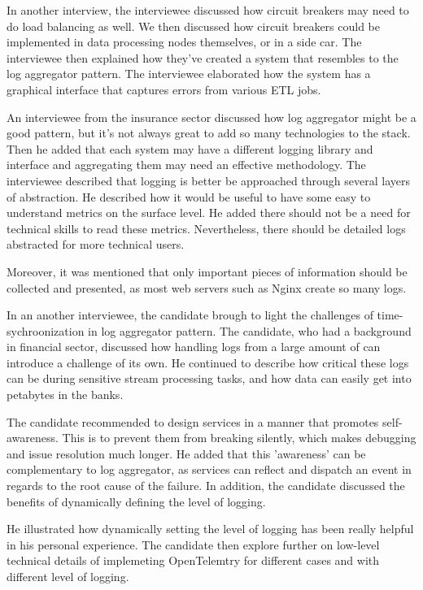 \documentclass{bmcart}
\begin{document}
In another interview, the interviewee discussed how circuit breakers may need to do load balancing as well. We then discussed how circuit breakers could be implemented in data processing nodes themselves, or in a side car. The interviewee then explained how they've created a system that resembles to the log aggregator pattern. The interviewee elaborated how the system has a graphical interface that captures errors from various ETL jobs. 

An interviewee from the insurance sector discussed how log aggregator might be a good pattern, but it's not always great to add so many technologies to the stack. Then he added that each system may have a different logging library and interface and aggregating them may need an effective methodology. The interviewee described that logging is better be approached through several layers of abstraction. He described how it would be useful to have some easy to understand metrics on the surface level. He added there should not be a need for technical skills to read these metrics. Nevertheless, there should be detailed logs abstracted for more technical users.

Moreover, it was mentioned that only important pieces of information should be collected and presented, as most web servers such as Nginx create so many logs. 

In an another interviewee, the candidate brough to light the challenges of time-sychroonization in log aggregator pattern. The candidate, who had a background in financial sector, discussed how handling logs from a large amount of can introduce a challenge of its own. He continued to describe how critical these logs can be during sensitive stream processing tasks, and how data can easily get into petabytes in the banks. 

The candidate recommended to design services in a manner that promotes self-awareness. This is to prevent them from breaking silently, which makes debugging and issue resolution much longer. He added that this 'awareness' can be complementary to log aggregator, as services can reflect and dispatch an event in regards to the root cause of the failure. In addition, the candidate discussed the benefits of dynamically defining the level of logging. 

He illustrated how dynamically setting the level of logging has been really helpful in his personal experience. The candidate then explore further on low-level technical details of implemeting OpenTelemtry for different cases and with different level of logging.  
\end{document}
